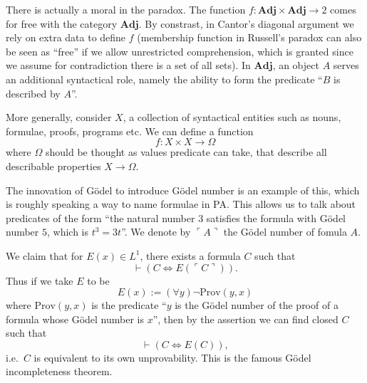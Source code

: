 \documentclass[a4paper]{article}
\renewcommand{\c}[1]{\mathbf{#1}}
\begin{document}
There is actually a moral in the paradox. The function \(f: \c{Adj} \times \c{Adj} \to 2\) comes for free with the category \(\c{Adj}\). By constrast, in Cantor's diagonal argument we rely on extra data to define \(f\) (membership function in Russell's paradox can also be seen as ``free'' if we allow unrestricted comprehension, which is granted since we assume for contradiction there is a set of all sets). In \(\c{Adj}\), an object \(A\) serves an additional syntactical role, namely the ability to form the predicate ``\(B\) is described by \(A\)''.

More generally, consider \(X\), a collection of syntactical entities such as nouns, formulae, proofs, programs etc. We can define a function
\[
  f: X \times X \to \Omega
\]
where \(\Omega\) should be thought as values predicate can take, that describe all describable properties \(X \to \Omega\).

The innovation of Gödel to introduce Gödel number is an example of this, which is roughly speaking a way to name formulae in PA. This allows us to talk about predicates of the form ``the natural number \(3\) satisfies the formula with Gödel number \(5\), which is \(t^3 = 3t\)''. We denote by \(\ulcorner A \urcorner\) the Gödel number of fomula \(A\).

We claim that for \(E(x) \in L^1\), there exists a formula \(C\) such that
\[
  \vdash (C \iff E(\ulcorner C \urcorner)).
\]
Thus if we take \(E\) to be
\[
  E(x) := (\forall y)\neg \text{Prov}(y, x)
\]
where \(\text{Prov}(y, x)\) is the predicate ``\(y\) is the Gödel number of the proof of a formula whose Gödel number is \(x\)'', then by the assertion we can find closed \(C\) such that
\[
  \vdash (C \iff E(C)),
\]
i.e.\ \(C\) is equivalent to its own unprovability. This is the famous Gödel incompleteness theorem.
\end{document}
